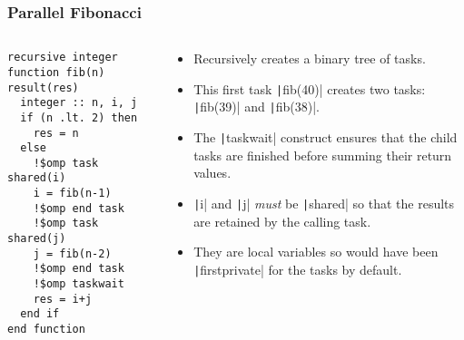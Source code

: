 \documentclass{beamer}
\begin{document}
\begin{frame}[fragile]
\frametitle{Parallel Fibonacci}
\begin{columns}
\begin{column}{0.5\textwidth}
\begin{verbatim}
recursive integer function fib(n) result(res)
  integer :: n, i, j
  if (n .lt. 2) then
    res = n
  else
    !$omp task shared(i)
    i = fib(n-1)
    !$omp end task
    !$omp task shared(j)
    j = fib(n-2)
    !$omp end task
    !$omp taskwait
    res = i+j
  end if
end function
\end{verbatim}
\end{column}

\begin{column}{0.6\textwidth}
\begin{itemize}
  \item Recursively creates a binary tree of tasks.
  \item This first task \texttt|fib(40)| creates two tasks: \texttt|fib(39)| and \texttt|fib(38)|.
  \item The \texttt|taskwait| construct ensures that the child tasks are finished before summing their return values.
  \item \texttt|i| and \texttt|j| \emph{must} be \texttt|shared| so that the results are retained by the calling task.
  \item They are local variables so would have been \texttt|firstprivate| for the tasks by default.
\end{itemize}
\end{column}

\end{columns}
\end{frame}

\end{document}
